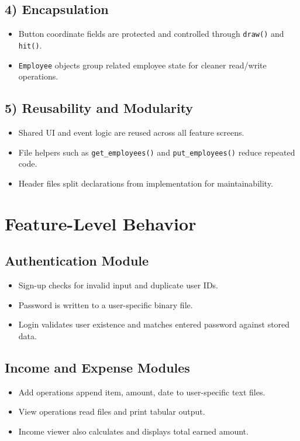 \documentclass[12pt,a4paper]{article}
\begin{document}
\subsection{4) Encapsulation}
\begin{itemize}[leftmargin=1.4em]
    \item Button coordinate fields are protected and controlled through \texttt{draw()} and \texttt{hit()}.
    \item \texttt{Employee} objects group related employee state for cleaner read/write operations.
\end{itemize}

\subsection{5) Reusability and Modularity}
\begin{itemize}[leftmargin=1.4em]
    \item Shared UI and event logic are reused across all feature screens.
    \item File helpers such as \texttt{get\_employees()} and \texttt{put\_employees()} reduce repeated code.
    \item Header files split declarations from implementation for maintainability.
\end{itemize}

\section{Feature-Level Behavior}
\subsection{Authentication Module}
\begin{itemize}[leftmargin=1.4em]
    \item Sign-up checks for invalid input and duplicate user IDs.
    \item Password is written to a user-specific binary file.
    \item Login validates user existence and matches entered password against stored data.
\end{itemize}

\subsection{Income and Expense Modules}
\begin{itemize}[leftmargin=1.4em]
    \item Add operations append item, amount, date to user-specific text files.
    \item View operations read files and print tabular output.
    \item Income viewer also calculates and displays total earned amount.
\end{itemize}
\end{document}
